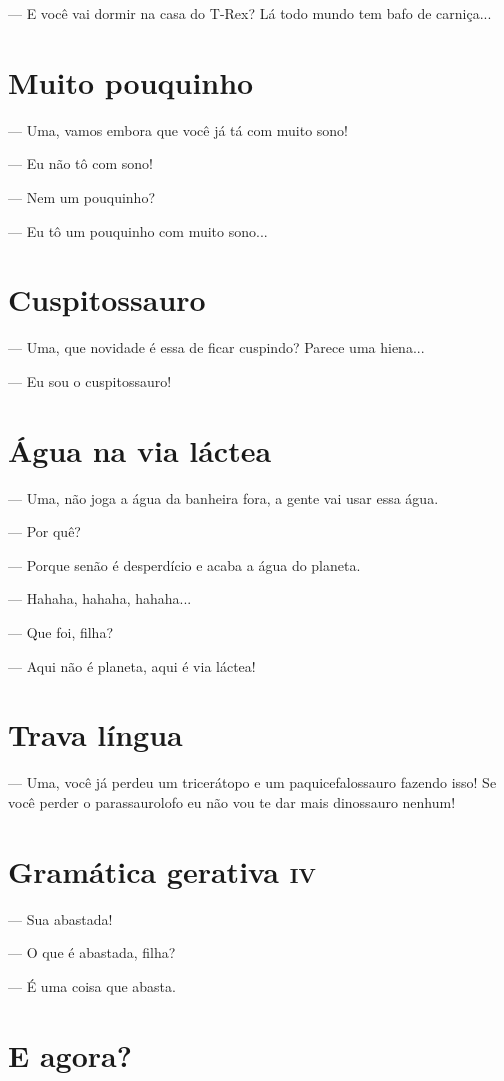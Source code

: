 — E você vai dormir na casa do T-Rex? Lá todo mundo tem bafo de
carniça...

\chapter{Muito pouquinho}

— Uma, vamos embora que você já tá com muito sono!

— Eu não tô com sono!

— Nem um pouquinho?

— Eu tô um pouquinho com muito sono...

\chapter{Cuspitossauro}

— Uma, que novidade é essa de ficar cuspindo? Parece uma hiena...

— Eu sou o cuspitossauro!

\chapter{Água na via láctea}

— Uma, não joga a água da banheira fora, a gente vai usar essa água.

— Por quê?

— Porque senão é desperdício e acaba a água do planeta.

— Hahaha, hahaha, hahaha...

— Que foi, filha?

— Aqui não é planeta, aqui é via láctea!

\chapter{Trava língua}

— Uma, você já perdeu um tricerátopo e um paquicefalossauro fazendo
isso! Se você perder o parassaurolofo eu não vou te dar mais dinossauro
nenhum!

\chapter{Gramática gerativa \textsc{iv}}

— Sua abastada!

— O que é abastada, filha?

— É uma coisa que abasta.

\chapter{E agora?}

